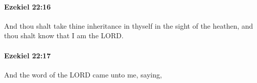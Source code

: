 		\paragraph{Ezekiel 22:16} %
			\label{EZEKIEL-22-16}

			And thou shalt take thine inheritance in thyself in the sight of the heathen, and thou shalt know that I am the LORD.


		\paragraph{Ezekiel 22:17} %
			\label{EZEKIEL-22-17}

			And the word of the LORD came unto me, saying,


